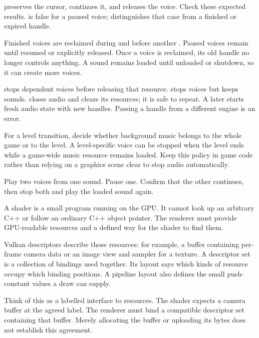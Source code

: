 \documentclass[11pt,a4paper]{article}
\begin{document}
 preserves the cursor,  continues it, and  releases the voice. Check these expected results.  is false for a paused voice;  distinguishes that case from a finished or expired handle.

Finished voices are reclaimed during  and before another . Paused voices remain until resumed or explicitly released. Once a voice is reclaimed, its old handle no longer controls anything. A sound remains loaded until unloaded or shutdown, so it can create more voices.

 stops dependent voices before releasing that resource.  stops voices but keeps sounds.  closes audio and clears its resources; it is safe to repeat. A later  starts fresh audio state with new handles. Passing a handle from a different engine is an error.

For a level transition, decide whether background music belongs to the whole game or to the level. A level-specific voice can be stopped when the level ends while a game-wide music resource remains loaded. Keep this policy in game code rather than relying on a graphics scene clear to stop audio automatically.

\begin{tryit}Play two voices from one sound. Pause one. Confirm that the other continues, then stop both and play the loaded sound again.\end{tryit}

A shader is a small program running on the GPU. It cannot look up an arbitrary C++  or follow an ordinary C++ object pointer. The renderer must provide GPU-readable resources and a defined way for the shader to find them.

Vulkan descriptors describe those resources: for example, a buffer containing per-frame camera data or an image view and sampler for a texture. A descriptor set is a collection of bindings used together. Its layout says which kinds of resource occupy which binding positions. A pipeline layout also defines the small push-constant values a draw can supply.

Think of this as a labelled interface to resources. The shader expects a camera buffer at the agreed label. The renderer must bind a compatible descriptor set containing that buffer. Merely allocating the buffer or uploading its bytes does not establish this agreement.
\end{document}
